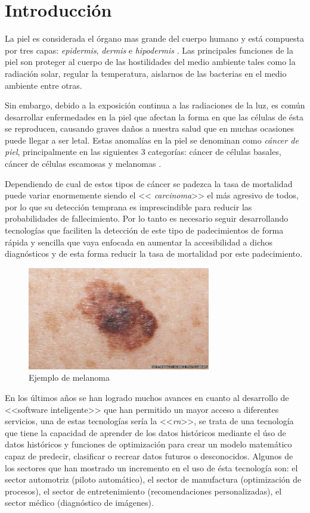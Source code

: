 
\chapter{Introducción}

La piel es considerada el órgano mas grande del cuerpo humano y está compuesta por tres capas: \emph{\gls{epidermis}}, \emph{\gls{dermis}} e \emph{\gls{hipodermis}} \cite{skin_1}. Las principales funciones de la piel son proteger al cuerpo de las hostilidades del medio ambiente tales como la radiación solar,  regular la temperatura, aislarnos de las bacterias en el medio ambiente entre otras.

Sin embargo, debido a la exposición continua a las radiaciones de la luz, es común desarrollar enfermedades en la piel que afectan la forma en que las células de ésta se reproducen, causando graves daños a nuestra salud que en muchas ocasiones puede llegar a ser letal. Estas anomalías en la piel se denominan como \emph{cáncer de piel}, principalmente en las siguientes 3 categorías: cáncer de células basales, cáncer de células escamosas y melanomas \citep{cancer_org}.

Dependiendo de cual de estos tipos de cáncer se padezca la tasa de mortalidad puede variar enormemente siendo el << \emph{carcinoma}>> el más agresivo de todos, por lo que su detección temprana es imprescindible para reducir las probabilidades de fallecimiento. Por lo tanto es necesario seguir desarrollando tecnologías que faciliten la detección de este tipo de padecimientos de forma rápida y sencilla que vaya enfocada en aumentar la accesibilidad a dichos diagnósticos y de esta forma reducir la tasa de mortalidad por este padecimiento.


\begin{figure}[h!]
    \includegraphics[width=80mm, scale = 0.8]{Figuras/skin_cancer_bbc.jpg}
    \centering
    \caption{Ejemplo de melanoma }
    \label{fig:can_jpg}
\end{figure}

En los últimos años se han logrado muchos avances en cuanto al desarrollo de <<software inteligente>> que han permitido un mayor acceso a diferentes servicios, una de estas tecnologías sería la <<\emph{\gls{rn}}>>, se trata de una tecnología que tiene la capacidad de aprender de los datos históricos mediante el úso de datos históricos y funciones de optimización para crear un modelo matemático capaz de predecir, clasificar o recrear datos futuros o desconocidos. Algunos de los sectores que han mostrado un incremento en el uso de ésta tecnología son: el sector automotriz (piloto automático), el sector de manufactura (optimización de procesos), el sector de entretenimiento (recomendaciones personalizadas), el sector médico (diagnóstico de imágenes). 


